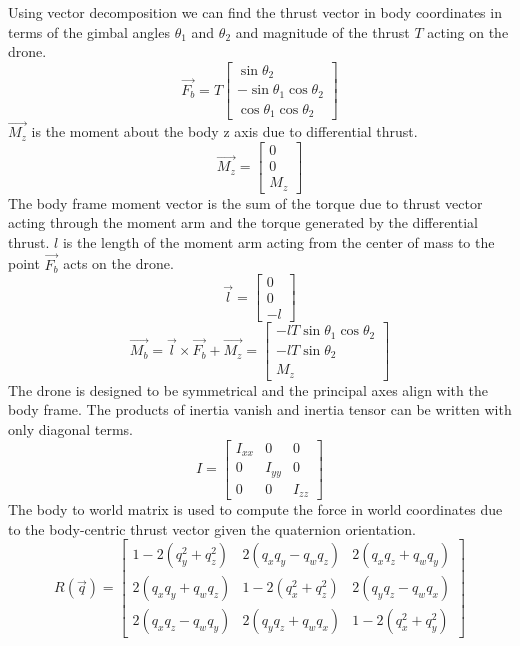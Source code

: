 \documentclass[]{article}
\begin{document}
Using vector decomposition we can find the thrust vector in body coordinates in terms of the gimbal angles $\theta_1$ and $\theta_2$ and magnitude of the thrust $T$ acting on the drone.
\[
\vec{F_b} = T
\begin{bmatrix}
	\sin{\theta_2}  \\
	-\sin{\theta_1}\cos{\theta_2}  \\
	\cos{\theta_1}\cos{\theta_2}
\end{bmatrix}
\]
$\vec{M_z}$ is the moment about the body z axis due to differential thrust. 
        \[
	\vec{M_z} =
        \begin{bmatrix}
        0  \\
        0  \\
        M_z
        \end{bmatrix}
        \]
The body frame moment vector is the sum of the torque due to thrust vector acting through the moment arm and the torque generated by the differential thrust. $l$ is the length of the moment arm acting from the center of mass to the point $\vec{F_b}$ acts on the drone. 
        \[
	\vec{l} =
        \begin{bmatrix}
        0  \\
        0  \\
        -l
        \end{bmatrix}
        \]
        	 \[
        \vec{M_b} = \vec{l} \times \vec{F_b} + \vec{M_z}=       
        \begin{bmatrix}
        -lT\sin{\theta_1}\cos{\theta_2}  \\
        -lT\sin{\theta_2}  \\
	M_z
        \end{bmatrix}
        \]
The drone is designed to be symmetrical and the principal axes align with the body frame. The products of inertia vanish and inertia tensor can be written with only diagonal terms.
         \[
        I =
        \begin{bmatrix}
        I_{xx} & 0 &0 \\
        0 & I_{yy }& 0 \\
        0 & 0 & I_{zz}
        \end{bmatrix}
        \]
The body to world matrix is used to compute the force in world coordinates due to the body-centric thrust vector given the quaternion orientation.
        \[
        R(\vec{q}) =
        \begin{bmatrix}
        1 - 2(q_y^2 + q_z^2) & 2(q_x q_y - q_w q_z) & 2(q_x q_z + q_w q_y) \\
        2(q_x q_y + q_w q_z) & 1 - 2(q_x^2 + q_z^2) & 2(q_y q_z - q_w q_x) \\
        2(q_x q_z - q_w q_y) & 2(q_y q_z + q_w q_x) & 1 - 2(q_x^2 + q_y^2)
        \end{bmatrix}
        \]
\end{document}
